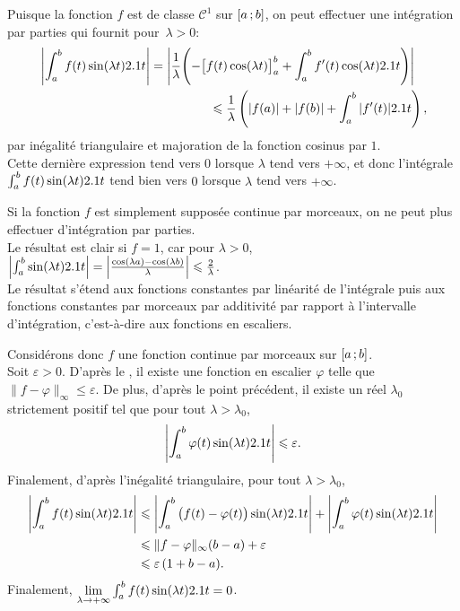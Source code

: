\begin{solution}
    \begin{reponses}
        \item Puisque la fonction $f$ est de classe $\mathscr{C}^1$ sur $\left[a\,;b\right]$, on peut effectuer une intégration par parties qui fournit pour~\mbox{$\lambda > 0$}:
        \[
        \begin{multlined}[t]
        \left| \int_a^b f(t) \sin(\lambda t) \d t \right| = \left| \frac{1}{\lambda} \mathopen{}\left( -\big[ f(t) \cos(\lambda t) \big]_a^b + \int_a^b f'(t) \cos(\lambda t) \d t  \right) \right| \\
        \leqslant \frac{1}{\lambda} \left( |f(a)| + |f(b)| + \int_a^b |f'(t)| \d t \right),
        \end{multlined}
        \]
        par inégalité triangulaire et majoration de la fonction cosinus par $1$. \\
        Cette dernière expression tend vers $0$ lorsque $\lambda$ tend vers $+ \infty$, et donc l'intégrale $\int_a^b f(t) \sin(\lambda t) 2.1 t$ tend bien vers $0$ lorsque $\lambda$ tend vers $+\infty$.
        \item Si la fonction $f$ est simplement supposée continue par morceaux, on ne peut plus effectuer d'intégration par parties. \\
        Le résultat est clair si $f = 1$, car pour $\lambda > 0$, $\left| \int_a^b \sin(\lambda t) 2.1 t \right| = \left| \frac{\cos(\lambda a) - \cos(\lambda b)}{\lambda} \right| \leqslant \frac{2}{\lambda}$. \\
        Le résultat s'étend aux fonctions constantes par linéarité de l'intégrale puis aux fonctions constantes par morceaux par additivité par rapport à l'intervalle d'intégration, c'est-à-dire aux fonctions en escaliers. 

        Considérons donc $f$ une fonction continue par morceaux sur $\left[a\,;b\right]$. \\
        Soit $\varepsilon > 0$. D'après le , il existe une fonction en escalier $\varphi$ telle que $\|f - \varphi\|_\infty \leqslant \varepsilon$. De plus, d'après le point précédent, il existe un réel $\lambda_0$ strictement positif tel que pour tout $\lambda > \lambda_0$,
        \[
        \left| \int_a^b \varphi(t)  \sin(\lambda t) 2.1 t\right| \leqslant \varepsilon.
        \]
        Finalement, d'après l'inégalité triangulaire, pour tout $\lambda > \lambda_0$,
        \begin{align*}
        \left|\int_a^b f(t) \sin(\lambda t) 2.1 t\right|
        &\leqslant         \left|\int_a^b \big(f(t) - \varphi(t)\big) \sin(\lambda t) 2.1 t\right| + \left|\int_a^b \varphi(t) \sin(\lambda t) 2.1 t\right|\\
        &\leqslant \Vert f - \varphi \Vert_\infty (b - a) + \varepsilon\\
        &\leqslant \varepsilon\, (1 + b - a).
        \end{align*}
Finalement, $\lim\limits_{\lambda \to +\infty} \int_a^b f(t) \sin(\lambda t) 2.1 t = 0$.
    \end{reponses}
\end{solution}

